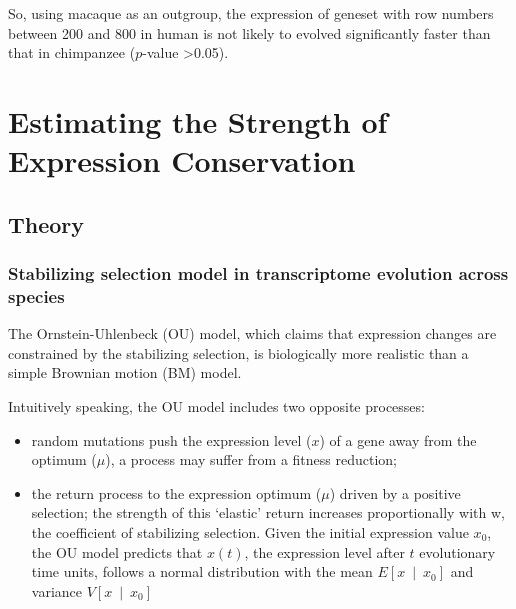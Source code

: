 \documentclass[]{book}
\providecommand{\tightlist}{%
  \setlength{\itemsep}{0pt}\setlength{\parskip}{0pt}}
\begin{document}
So, using macaque as an outgroup, the expression of geneset with row numbers between 200 and 800 in human is not likely to evolved significantly faster than that in chimpanzee (\(p\)-value \textgreater{}0.05).

\hypertarget{estimating-the-strength-of-expression-conservation}{%
\chapter{Estimating the Strength of Expression Conservation}\label{estimating-the-strength-of-expression-conservation}}

\hypertarget{theory-2}{%
\section{Theory}\label{theory-2}}

\hypertarget{stabilizing-selection-model-in-transcriptome-evolution-across-species}{%
\subsection{Stabilizing selection model in transcriptome evolution across species}\label{stabilizing-selection-model-in-transcriptome-evolution-across-species}}

The Ornstein-Uhlenbeck (OU) model, which claims that expression changes are constrained by the stabilizing selection, is biologically more realistic than a simple Brownian motion (BM) model\citep[\citet{lemos2005}\citet{gu2007}\citet{bedford2009}\citet{brawand2011}]{rohlfs2014}.

Intuitively speaking, the OU model includes two opposite processes:

\begin{itemize}
\tightlist
\item
  random mutations push the expression level (\(x\)) of a gene away from the optimum (\(\mu\)), a process may suffer from a fitness reduction;
\item
  the return process to the expression optimum (\(\mu\)) driven by a positive selection; the strength of this `elastic' return increases proportionally with w, the coefficient of stabilizing selection. Given the initial expression value \({x_0}\), the OU model predicts that \(x\left(t\right)\), the expression level after \(t\) evolutionary time units, follows a normal distribution with the mean \(E\left[x\  \mid\  x_0\right]\) and variance \(V\left[x\  \mid\  x_0\right]\)
\end{itemize}
\end{document}
